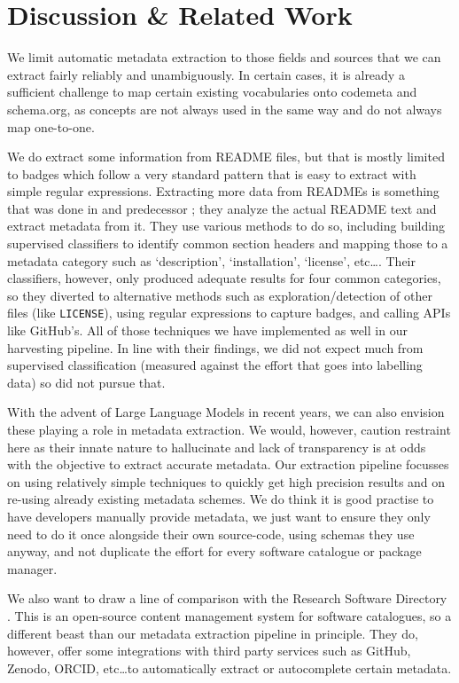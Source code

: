 \documentclass[a4paper,11pt]{article}
\begin{document}
\section{Discussion \& Related Work}

We limit automatic metadata extraction to those fields and sources that we can
extract fairly reliably and unambiguously. In certain cases, it is already a
sufficient challenge to map certain existing vocabularies onto codemeta and
schema.org, as concepts are not always used in the same way and do not always
map one-to-one.

We do extract some information from README files, but that is mostly limited to
badges which follow a very standard pattern that is easy to extract with simple
regular expressions. Extracting more data from READMEs is something that was
done in \cite{SOMEF} and predecessor \cite{SOMEF19}; they analyze the actual
README text and extract metadata from it. They use various methods to do so,
including building supervised classifiers to identify common section headers
and mapping those to a metadata category such as `description', `installation',
`license', etc\ldots. Their classifiers, however, only produced adequate
results for four common categories, so they diverted to alternative methods
such as exploration/detection of other files (like \texttt{LICENSE}), using
regular expressions to capture badges, and calling APIs like GitHub's. All of
those techniques we have implemented as well in our harvesting pipeline. In
line with their findings, we did not expect much from supervised classification
(measured against the effort that goes into labelling data) so did not pursue
that.

With the advent of Large Language Models in recent years, we can also envision
these playing a role in metadata extraction. We would, however, caution
restraint here as their innate nature to hallucinate and lack of transparency
is at odds with the objective to extract accurate metadata. Our extraction
pipeline focusses on using relatively simple techniques to quickly get high
precision results and on re-using already existing metadata schemes. We do
think it is good practise to have developers manually provide metadata, we just
want to ensure they only need to do it once alongside their own source-code,
using schemas they use anyway, and not duplicate the effort for every software
catalogue or package manager.

We also want to draw a line of comparison with the Research Software Directory
\citep{RSD, RSD2}. This is an open-source content management system for
software catalogues, so a different beast than our metadata extraction pipeline
in principle. They do, however, offer some integrations with third party
services such as GitHub, Zenodo, ORCID, etc\ldots to automatically extract or
autocomplete certain metadata.
\end{document}
